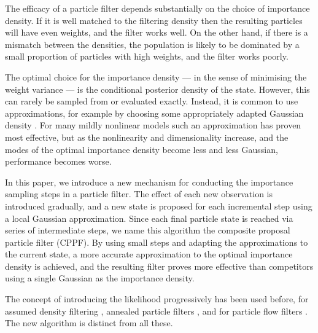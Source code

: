 \documentclass[conference]{IEEEtran}
\begin{document}
The efficacy of a particle filter depends substantially on the choice of importance density. If it is well matched to the filtering density then the resulting particles will have even weights, and the filter works well. On the other hand, if there is a mismatch between the densities, the population is likely to be dominated by a small proportion of particles with high weights, and the filter works poorly.

The optimal choice for the importance density --- in the sense of minimising the weight variance --- is the conditional posterior density of the state. However, this can rarely be sampled from or evaluated exactly. Instead, it is common to use approximations, for example by choosing some appropriately adapted Gaussian density \cite{Doucet2000a,Merwe2000}. For many mildly nonlinear models such an approximation has proven most effective, but as the nonlinearity and dimensionality increase, and the modes of the optimal importance density become less and less Gaussian, performance becomes worse.

In this paper, we introduce a new mechanism for conducting the importance sampling steps in a particle filter. The effect of each new observation is introduced gradually, and a new state is proposed for each incremental step using a local Gaussian approximation. Since each final particle state is reached via series of intermediate steps, we name this algorithm the composite proposal particle filter (CPPF). By using small steps and adapting the approximations to the current state, a more accurate approximation to the optimal importance density is achieved, and the resulting filter proves more effective than competitors using a single Gaussian as the importance density.

The concept of introducing the likelihood progressively has been used before, for assumed density filtering \cite{Hanebeck2003,Hagmar2011}, annealed particle filters \cite{Godsill2001b,Gall2007,Deutscher2000}, and for particle flow filters \cite{Daum2011d}. The new algorithm is distinct from all these.

\end{document}
